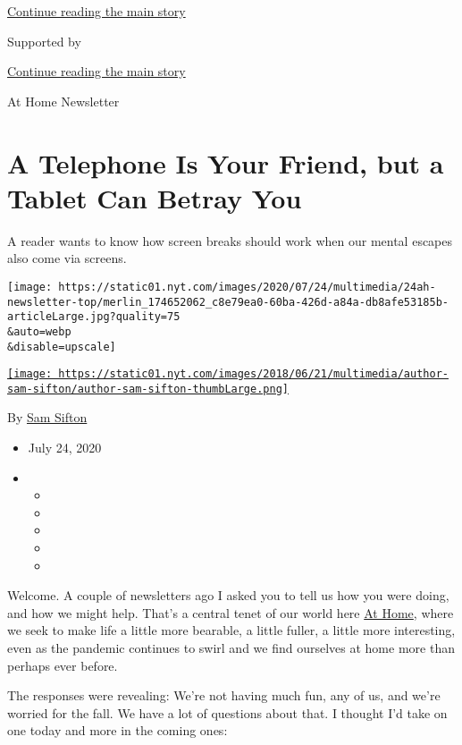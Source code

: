 \protect\hyperlink{after-top}{Continue reading the main story}

Supported by

\protect\hyperlink{after-sponsor}{Continue reading the main story}

At Home Newsletter

\hypertarget{a-telephone-is-your-friend-but-a-tablet-can-betray-you}{%
\section{A Telephone Is Your Friend, but a Tablet Can Betray
You}\label{a-telephone-is-your-friend-but-a-tablet-can-betray-you}}

A reader wants to know how screen breaks should work when our mental
escapes also come via screens.

\texttt{[image: https://static01.nyt.com/images/2020/07/24/multimedia/24ah-newsletter-top/merlin\_174652062\_c8e79ea0-60ba-426d-a84a-db8afe53185b-articleLarge.jpg?quality=75\\\&auto=webp\\\&disable=upscale]}

\href{https://www.nytimes.com/by/sam-sifton}{\texttt{[image: https://static01.nyt.com/images/2018/06/21/multimedia/author-sam-sifton/author-sam-sifton-thumbLarge.png]}}

By \href{https://www.nytimes.com/by/sam-sifton}{Sam Sifton}

\begin{itemize}
\item
  July 24, 2020
\item
  \begin{itemize}
  \item
  \item
  \item
  \item
  \item
  \end{itemize}
\end{itemize}

Welcome. A couple of newsletters ago I asked you to tell us how you were
doing, and how we might help. That's a central tenet of our world here
\href{http://www.nytimes.com/athome}{At Home}, where we seek to make
life a little more bearable, a little fuller, a little more interesting,
even as the pandemic continues to swirl and we find ourselves at home
more than perhaps ever before.

The responses were revealing: We're not having much fun, any of us, and
we're worried for the fall. We have a lot of questions about that. I
thought I'd take on one today and more in the coming ones:

